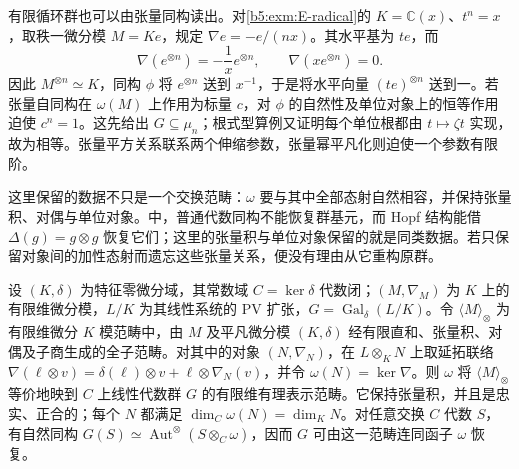 \ProseParagraphBreak
有限循环群也可以由张量同构读出。对\cref{b5:exm:E-radical}的 \(K=\mathbb C(x)\)、\(t^n=x\)，取秩一微分模 \(M=Ke\)，规定 \(\nabla e=-e/(nx)\)。其水平基为 \(te\)，而
\[
	\nabla(e^{\otimes n})=-\frac1x e^{\otimes n}, \qquad \nabla(xe^{\otimes n})=0.
\]
因此 \(M^{\otimes n}\simeq K\)，同构 \(\phi\) 将 \(e^{\otimes n}\) 送到 \(x^{-1}\)，于是将水平向量 \((te)^{\otimes n}\) 送到一。若张量自同构在 \(\omega(M)\) 上作用为标量 \(c\)，对 \(\phi\) 的自然性及单位对象上的恒等作用迫使 \(c^n=1\)。这先给出 \(G\subseteq\mu_n\)；根式型算例又证明每个单位根都由 \(t\mapsto\zeta t\) 实现，故为相等。张量平方关系联系两个伸缩参数，张量幂平凡化则迫使一个参数有限阶。

这里保留的数据不只是一个交换范畴：\(\omega\) 要与其中全部态射自然相容，并保持张量积、对偶与单位对象。中，普通代数同构不能恢复群基元，而 Hopf 结构能借 \(\Delta(g)=g\otimes g\) 恢复它们；这里的张量积与单位对象保留的就是同类数据。若只保留对象间的加性态射而遗忘这些张量关系，便没有理由从它重构原群。

\begin{theorem}[PV 理论的张量表述]\label{b5:thm:E-tannaka}
	设 \((K,\delta)\) 为特征零微分域，其常数域 \(C=\ker\delta\) 代数闭；\((M,\nabla_M)\) 为 \(K\) 上的有限维微分模，\(L/K\) 为其线性系统的 PV 扩张，\(G=\operatorname{Gal}_\delta(L/K)\)。令 \(\langle M\rangle_\otimes\) 为有限维微分 \(K\) 模范畴中，由 \(M\) 及平凡微分模 \((K,\delta)\) 经有限直和、张量积、对偶及子商生成的全子范畴。对其中的对象 \((N,\nabla_N)\)，在 \(L\otimes_KN\) 上取延拓联络 \(\nabla(\ell\otimes v)=\delta(\ell)\otimes v+\ell\otimes\nabla_N(v)\)，并令 \(\omega(N)=\ker\nabla\)。则 \(\omega\) 将 \(\langle M\rangle_\otimes\) 等价地映到 \(C\) 上线性代数群 \(G\) 的有限维有理表示范畴。它保持张量积，并且是忠实、正合的；每个 \(N\) 都满足 \(\dim_C\omega(N)=\dim_KN\)。对任意交换 \(C\) 代数 \(S\)，有自然同构 \(G(S)\simeq\operatorname{Aut}^\otimes(S\otimes_C\omega)\)，因而 \(G\) 可由这一范畴连同函子 \(\omega\) 恢复。
\end{theorem}

